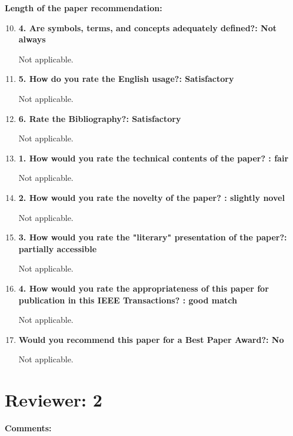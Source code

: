 \documentclass[12pt]{article}
\begin{document}
\textbf{Length of the paper recommendation:}

\begin{enumerate}
\setcounter{enumi}{9}
\item \textbf{4. Are symbols, terms, and concepts adequately defined?: Not always}

Not applicable.

\item \textbf{5. How do you rate the English usage?: Satisfactory}

Not applicable.

\item \textbf{6. Rate the Bibliography?: Satisfactory}

Not applicable.

\item \textbf{1. How would you rate the technical contents of the paper? : fair}

Not applicable.

\item \textbf{2. How would you rate the novelty of the paper? : slightly novel}

Not applicable.

\item \textbf{3. How would you rate the "literary" presentation of the paper?: partially 
accessible}

Not applicable.

\item \textbf{4. How would you rate the appropriateness of this paper for publication in 
this IEEE Transactions? : good match}

Not applicable.

\item \textbf{Would you recommend this paper for a Best Paper Award?: No}

Not applicable.

\end{enumerate}


\section*{Reviewer: 2}

\textbf{Comments:}
\end{document}

